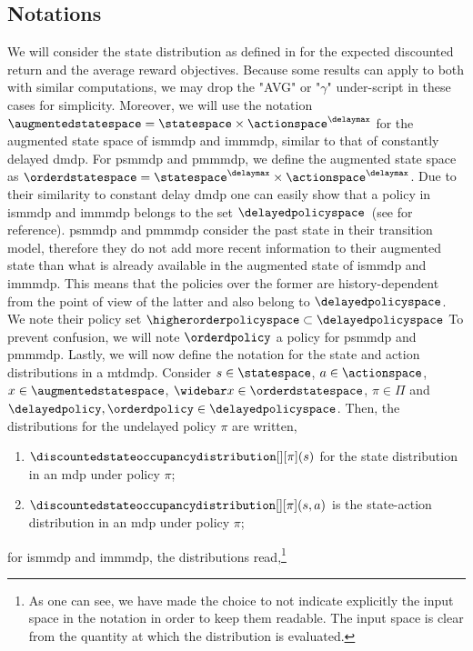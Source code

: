\subsection{Notations}
We will consider the state distribution as defined in  for the expected discounted return and the average reward objectives. 
Because some results can apply to both with similar computations, we may drop the "AVG" or "$\gamma$" under-script in these cases for simplicity. 
Moreover, we will use the notation $\augmentedstatespace=\statespace\times\actionspace^{\delaymax}$ for the augmented state space of \gls{ismmdp} and \gls{immmdp}, similar to that of constantly delayed \gls{dmdp}. 
For \gls{psmmdp} and \gls{pmmmdp}, we define the augmented state space as $\orderdstatespace=\statespace^{\delaymax}\times\actionspace^{\delaymax}$. 
Due to their similarity to constant delay \gls{dmdp} one can easily show that a policy in \gls{ismmdp} and \gls{immmdp} belongs to the set $\delayedpolicyspace$~(see  for reference). 
\gls{psmmdp} and \gls{pmmmdp} consider the past state in their transition model, therefore they do not add more recent information to their augmented state than what is already available in the augmented state of \gls{ismmdp} and \gls{immmdp}. 
This means that the policies over the former are history-dependent from the point of view of the latter and also belong to $\delayedpolicyspace$. 
We note their policy set $\higherorderpolicyspace \subset \delayedpolicyspace$
To prevent confusion, we will note $\orderdpolicy$ a policy for \gls{psmmdp} and \gls{pmmmdp}.
Lastly, we will now define the notation for the state and action distributions in a \gls{mtdmdp}. 
Consider $s\in\statespace$, $a\in\actionspace$, $x\in\augmentedstatespace$, $\widebar x\in\orderdstatespace$, $\pi\in\Pi$ and $\delayedpolicy,\orderdpolicy\in\delayedpolicyspace$.
Then, the distributions for the undelayed policy $\pi$ are written,
\begin{enumerate}
    \item $\discountedstateoccupancydistribution[][\pi](s)$ for the state distribution in an \gls{mdp} under policy $\pi$;
    \item $\discountedstateoccupancydistribution[][\pi](s,a)$ is the state-action distribution in an \gls{mdp} under policy $\pi$;
\end{enumerate} 
for \gls{ismmdp} and \gls{immmdp}, the distributions read,\footnote{As one can see, we have made the choice to not indicate explicitly the input space in the notation in order to keep them readable. The input space is clear from the quantity at which the distribution is evaluated.}
